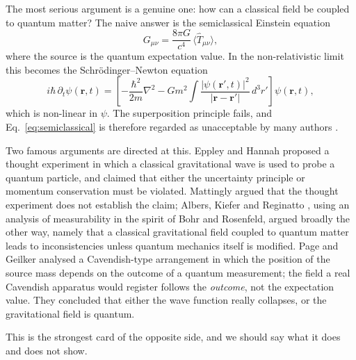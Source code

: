The most serious argument is a genuine one: how can a classical field be
coupled to quantum matter? The naive answer is the semiclassical
Einstein equation
\begin{equation}
  G_{\mu\nu} = \frac{8\pi G}{c^4}\,\langle \hat T_{\mu\nu}\rangle ,
  \label{eq:semiclassical}
\end{equation}
where the source is the quantum expectation value. In the non-relativistic
limit this becomes the Schr\"odinger--Newton equation
\cite{qg:diosi84,qg:penrose}
\begin{equation}
  i\hbar\,\partial_t \psi(\mathbf r,t) =
  \left[-\frac{\hbar^2}{2m}\nabla^2
    - G m^2 \!\int\! \frac{|\psi(\mathbf r',t)|^2}{|\mathbf r-\mathbf r'|}
    \,d^3r'\right]\psi(\mathbf r,t),
  \label{eq:sn}
\end{equation}
which is non-linear in $\psi$. The superposition principle fails, and
Eq.~\eqref{eq:semiclassical} is therefore regarded as unacceptable by many
authors \cite{qg:kibble}.

Two famous arguments are directed at this. Eppley and Hannah
\cite{qg:eppley} proposed a thought experiment in which a classical
gravitational wave is used to probe a quantum particle, and claimed that
either the uncertainty principle or momentum conservation must be
violated. Mattingly \cite{qg:mattingly} argued that the thought
experiment does not establish the claim; Albers, Kiefer and Reginatto
\cite{qg:albers}, using an analysis of measurability in the spirit of Bohr
and Rosenfeld, argued broadly the other way, namely that a classical
gravitational field coupled to quantum matter leads to inconsistencies
unless quantum mechanics itself is modified. Page and Geilker
\cite{qg:page} analysed a Cavendish-type arrangement in which the position
of the source mass depends on the outcome of a quantum measurement; the
field a real Cavendish apparatus would register follows the \emph{outcome},
not the expectation value. They concluded that either the wave function
really collapses, or the gravitational field is quantum.

This is the strongest card of the opposite side, and we should say what
it does and does not show.

